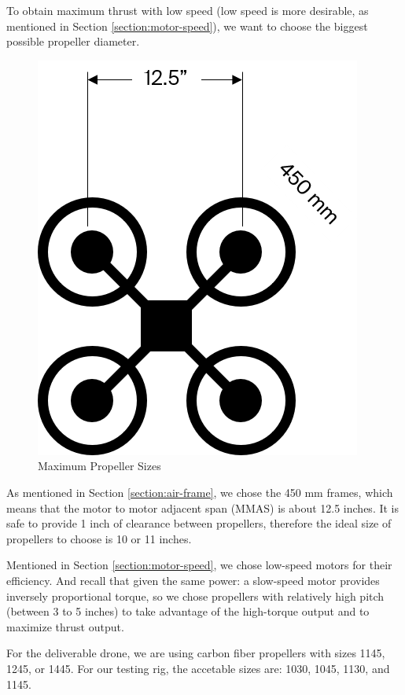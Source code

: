 To obtain maximum thrust with low speed (low speed is more desirable, as mentioned in Section \ref{section:motor-speed}), we want to choose the biggest possible propeller diameter.

\begin{figure}[h]
    \centering
    \includegraphics[scale=0.5]{img/framepropsize}
    \caption{Maximum Propeller Sizes}
    \label{fig:framepropsize}
\end{figure}

As mentioned in Section \ref{section:air-frame}, we chose the 450 mm frames, which means that the motor to motor 
adjacent span (MMAS) is about 12.5 inches. It is safe to provide 1 inch of clearance between propellers, 
therefore the ideal size of propellers to choose is 10 or 11 inches.

Mentioned in Section \ref{section:motor-speed}, we chose low-speed motors for their efficiency. And recall that 
given the same power: a slow-speed motor provides inversely proportional torque, so we chose propellers 
with relatively high pitch (between 3 to 5 inches) to take advantage of the high-torque output and to
maximize thrust output.

For the deliverable drone, we are using carbon fiber propellers with sizes 1145, 1245, or 1445. For our testing rig, the accetable sizes are: 1030, 1045, 1130, and 1145.

